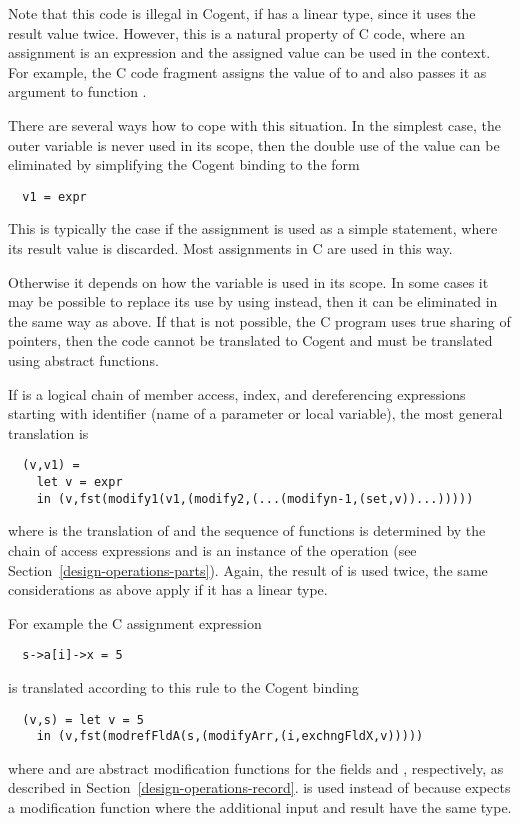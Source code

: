 Note that this code is illegal in Cogent, if  has a linear type, since it uses the result value twice. However, this
is a natural property of C code, where an assignment is an expression and the assigned value can be used in the context. For example,
the C code fragment  assigns the value of  to  and also passes it as argument to function .

There are several ways how to cope with this situation. In the simplest case, the outer variable  is never used in its
scope, then the double use of the value can be eliminated by simplifying the Cogent binding to the form
\begin{verbatim}
  v1 = expr
\end{verbatim}
This is typically the case if the assignment is used as a simple statement, where its result value is discarded. Most assignments
in C are used in this way.

Otherwise it depends on how the variable  is used in its scope. In some cases it may be possible to replace its use by 
using  instead, then it can be eliminated in the same way as above. If that is not possible, the C program uses true
sharing of pointers, then the code cannot be translated to Cogent and must be translated using abstract functions.

If  is a logical chain of  member access, index, and dereferencing expressions starting with identifier  
(name of a parameter or local variable), the most general translation is
\begin{verbatim}
  (v,v1) =
    let v = expr
    in (v,fst(modify1(v1,(modify2,(...(modifyn-1,(set,v))...)))))
\end{verbatim}
where  is the translation of  and the sequence of  functions is determined by the chain of access
expressions and  is an 
instance of the operation  (see Section~\ref{design-operations-parts}). Again, the result of  is used twice,
the same considerations as above apply if it has a linear type.

For example the C assignment expression
\begin{verbatim}
  s->a[i]->x = 5
\end{verbatim}
is translated according to this rule to the Cogent binding
\begin{verbatim}
  (v,s) = let v = 5
    in (v,fst(modrefFldA(s,(modifyArr,(i,exchngFldX,v)))))
\end{verbatim}
where  and  are abstract modification functions for the fields  and ,
respectively, as described in Section~\ref{design-operations-record}.  is used instead of 
because  expects a modification function where the additional input and result have the same type.

